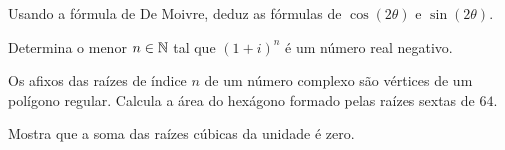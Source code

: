 \documentclass[12pt]{article}
\begin{document}
\begin{exercicios}
  \item Usando a fórmula de De Moivre, deduz as fórmulas de $\cos(2\theta)$ e $\sin(2\theta)$.
  \item Determina o menor $n \in \mathbb{N}$ tal que $(1 + i)^n$ é um número real negativo.
  \item Os afixos das raízes de índice $n$ de um número complexo são vértices de um polígono regular. Calcula a área do hexágono formado pelas raízes sextas de $64$.
  \item Mostra que a soma das raízes cúbicas da unidade é zero.
\end{exercicios}
\end{document}
